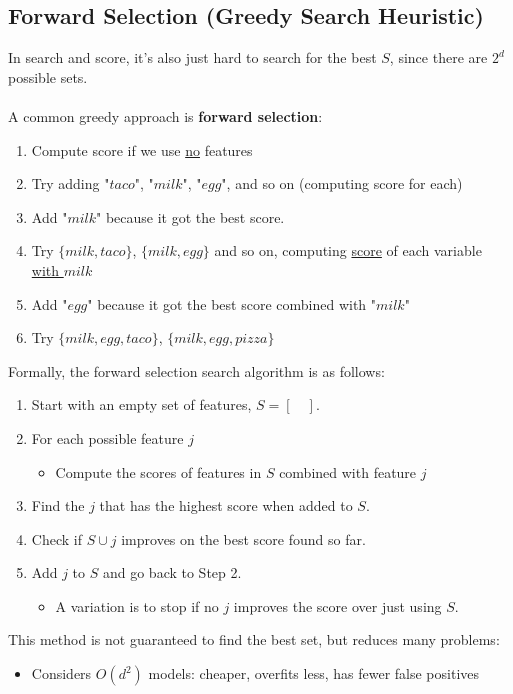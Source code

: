 \documentclass{article}
\def\blu#1{{\color{blu}#1}}
\def\gre#1{{\color{gre}#1}}
\def\red#1{{\color{red}#1}}
\begin{document}
\subsection*{Forward Selection (Greedy Search Heuristic)}
In search and score, it’s also just \red{hard to search for the best $ S $}, since there are \red{$ 2^d $ possible sets}. \\ \\
A common greedy approach is \textbf{\blu{forward selection}}:
\begin{enumerate}
	\item \gre{Compute score if we use \underline{no} features}
	\item \gre{Try adding "$ taco $", "$ milk $", "$ egg $", and so on (computing score for each)}
	\item Add "$ milk $" because it got the best score. 
	\item \gre{Try $ \{milk, taco\} $, $ \{milk, egg\} $ and so on, computing \underline{score} of each variable \underline{with $ milk $}}
	\item Add "$ egg $" because it got the best score combined with "$ milk $"
	\item \gre{Try $ \{milk, egg, taco\} $, $ \{milk, egg, pizza\} $}
\end{enumerate}
Formally, the \blu{forward selection} search algorithm is as follows:
\begin{enumerate}
	\item Start with an \gre{empty set} of features, $ S = [\quad] $.
	\item For each possible feature $ j $
	\begin{itemize}[label=-]
		\item \gre{Compute the scores of features in $ S $ combined with feature $ j $}
	\end{itemize}
	\item Find the $ j $ that has the highest score when added to $ S $.
	\item Check if {$S \cup j$} improves on the best score found so far.
	\item Add $ j $ to $ S $ and go back to Step 2.
	\begin{itemize}[label=-]
		\item A variation is to \red{stop if no $ j $ improves the score} over just using $ S $.
	\end{itemize}
\end{enumerate}
This method is \red{not guaranteed to find the best set}, \gre{but reduces many problems}:
\begin{itemize}
	\item Considers $ O(d^2) $ models: cheaper, overfits less, has fewer false positives
\end{itemize}
\end{document}
